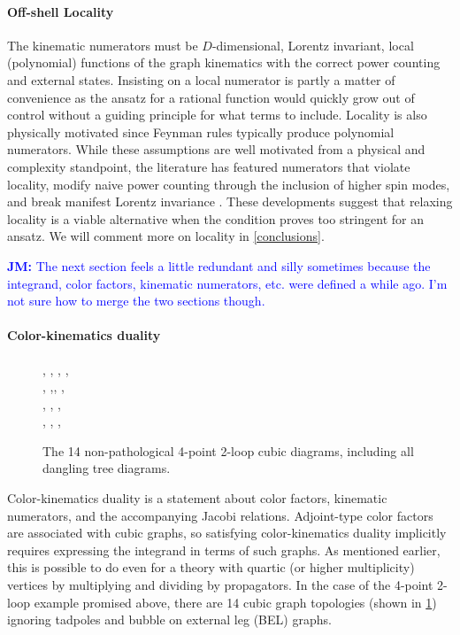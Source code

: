 \documentclass[11pt,letter]{article}
\newcommand{\jm}[1]{\textcolor{blue}{\textbf{JM: }{#1}}}
\begin{document}
\paragraph{Off-shell Locality}

The kinematic numerators must be $D$-dimensional, Lorentz invariant,
local (polynomial) functions of the graph kinematics with the correct
power counting and external states.  Insisting on a local numerator is
partly a matter of convenience as the ansatz for a rational function
would quickly grow out of control without a guiding principle for what
terms to include.  Locality is also physically motivated since Feynman
rules typically produce polynomial numerators.  While these
assumptions are well motivated from a physical and complexity
standpoint, the literature has featured numerators that violate
locality, modify naive power counting through the inclusion of higher
spin modes, and break manifest Lorentz invariance \cite{Square,
  WeinzierlBCJLagrangian, Mogull:2015adi, FivePointN4BCJ,
  Johansson:2017bfl, Ben-Shahar:2022ixa, Cheung:2016prv,
  Cheung:2021zvb}.  These developments suggest that relaxing locality
is a viable alternative when the condition proves too stringent for an
ansatz.  We will comment more on locality in \cref{conclusions}.

\jm{The next section feels a little redundant and silly sometimes
  because the integrand, color factors, kinematic numerators,
  etc. were defined a while ago.  I'm not sure how to merge the two
  sections though.}



\paragraph{Color-kinematics duality}
\begin{figure}
\centering
{\MCutC, \MCutD, \sumoCut, \MCutJ,  
 \\
  \doubleBoxCut,  \crossBoxCut,\pentaTriangleCut,  \MCutF, 
\\
\MCutI,  \MCutE, \MCutK, 
\\
 \MCutL, \MCutG,  \MCutH,
}
\caption{The 14 non-pathological 4-point 2-loop cubic diagrams,
  including all dangling tree diagrams.} \label{fig:MaxCuts}
  \end{figure}

Color-kinematics duality is a statement about color factors, kinematic
numerators, and the accompanying Jacobi relations.  Adjoint-type color
factors are associated with cubic graphs, so satisfying
color-kinematics duality implicitly requires expressing the integrand
in terms of such graphs. As mentioned earlier, this is possible to do
even for a theory with quartic (or higher multiplicity) vertices by
multiplying and dividing by propagators.  In the case of the 4-point
2-loop example promised above, there are 14 cubic graph topologies
(shown in \cref{fig:MaxCuts}) ignoring tadpoles and bubble on external
leg (BEL) graphs.
\end{document}
